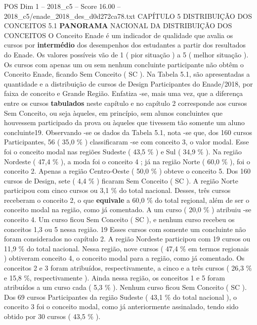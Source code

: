 \begin{textsample}{POS Dim 1 – 2018\_c5 – Score 16.00 – 2018\_c5/enade\_2018\_des\_d0d272ca78.txt}  \label{ex:f1_pos_061}
CAPÍTULO 5 DISTRIBUIÇÃO DOS CONCEITOS 5.1 \textbf{PANORAMA} NACIONAL DA DISTRIBUIÇÃO DOS CONCEITOS O Conceito Enade é um indicador de qualidade que avalia os cursos por \textbf{intermédio} dos desempenhos dos estudantes a partir dos resultados do Enade.
Os valores possíveis vão de 1 ( pior situação ) a 5 ( melhor situação ).
Os cursos com apenas um ou sem nenhum concluinte participante não obtêm o Conceito Enade, ficando Sem Conceito ( SC ).
Na Tabela 5.1, são apresentadas a quantidade e a distribuição de cursos de Design Participantes do Enade/2018, por faixa de conceito e Grande Região.
Enfatiza -se, mais uma vez, que a diferença entre os cursos \textbf{tabulados} neste capítulo e no capítulo 2 corresponde aos cursos Sem Conceito, ou seja àqueles, em princípio, sem alunos concluintes que houvessem participado da prova ou àqueles que tivessem tão somente um aluno concluinte19.
Observando -se os dados da Tabela 5.1, nota -se que, dos 160 cursos Participantes, 56 ( 35,0 \% ) classificaram -se com conceito 3, o valor modal.
Esse foi o conceito modal nas regiões Sudeste ( 43,5 \% ) e Sul ( 34,9 \% ).
Na região Nordeste ( 47,4 \% ), a moda foi o conceito 4 ; já na região Norte ( 60,0 \% ), foi o conceito 2.
Apenas a região Centro-Oeste ( 50,0 \% ) obteve o conceito 5.
Dos 160 cursos de Design, sete ( 4,4 \% ) ficaram Sem Conceito ( SC ).
A região Norte participou com cinco cursos ou 3,1 \% do total nacional.
Desses, três cursos receberam o conceito 2, o que \textbf{equivale} a 60,0 \% do total regional, além de ser o conceito modal na região, como já comentado.
A um curso ( 20,0 \% ) atribuiu -se conceito 4.
Um curso ficou Sem Conceito ( SC ), e nenhum curso recebeu os conceitos 1,3 ou 5 nessa região. 19 Esses cursos com somente um concluinte não foram considerados no capítulo 2.
A região Nordeste participou com 19 cursos ou 11,9 \% do total nacional.
Nessa região, nove cursos ( 47,4 \% em termos regionais ) obtiveram conceito 4, o conceito modal para a região, como já comentado.
Os conceitos 2 e 3 foram atribuídos, respectivamente, a cinco e a três cursos ( 26,3 \% e 15,8 \%, respectivamente ).
Ainda nessa região, os conceitos 1 e 5 foram atribuídos a um curso cada ( 5,3 \% ).
Nenhum curso ficou Sem Conceito ( SC ).
Dos 69 cursos Participantes da região Sudeste ( 43,1 \% do total nacional ), o conceito 3 foi o conceito modal, como já anteriormente assinalado, tendo sido obtido por 30 cursos ( 43,5 \% ).

\end{textsample}
